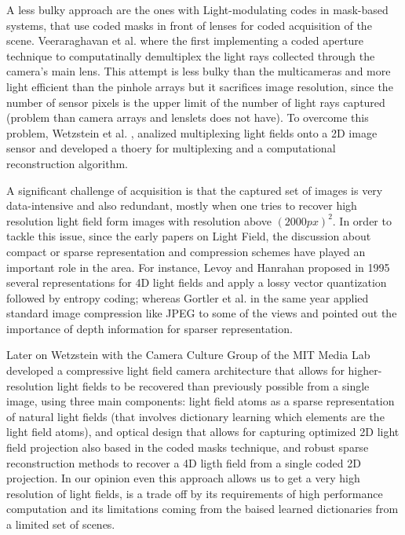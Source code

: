 \bigskip

A less bulky approach are the ones with Light-modulating codes in mask-based systems, that use coded masks in front of lenses for coded acquisition of the scene. Veeraraghavan et al. \cite{Veeraraghavan} where the first implementing a coded aperture technique to computatinally demultiplex the light rays collected through the camera's main lens. This attempt is less bulky than the multicameras and more light efficient than the pinhole arrays but it sacrifices image resolution, since the number of sensor pixels is the upper limit of the number of light rays captured (problem than camera arrays and lenslets does not have). To overcome this problem, Wetzstein et al. \cite{Wetzstein}, analized multiplexing light fields onto a 2D image sensor and developed a thoery for multiplexing and a computational reconstruction algorithm. 

\bigskip

A significant challenge of acquisition is that the captured set of images is very data-intensive and also redundant, mostly when one tries to recover high resolution light field form images with resolution above $(2000px)^2$. In order to tackle this issue, since the early papers on Light Field, the discussion about compact or sparse representation and compression schemes have played an important role in the area. For instance, Levoy and Hanrahan \cite{Levoy} proposed in 1995 several representations for 4D light fields and apply a lossy vector quantization followed by entropy coding; whereas Gortler et al. \cite{Gortler} in the same year applied standard image compression like JPEG to some of the views and pointed out the importance of depth information for sparser representation.

\bigskip

Later on Wetzstein with the Camera Culture Group of the MIT Media Lab developed a compressive light field camera architecture that allows for higher-resolution light fields to be recovered than previously possible from a single image, using three main components: light field atoms as a sparse representation of natural light fields (that involves dictionary learning which elements are the light field atoms), and optical design that allows for capturing optimized 2D light field projection also based in the coded masks technique, and robust sparse reconstruction methods to recover a 4D ligth field from a single coded 2D projection. In our opinion even this approach allows us to get a very high resolution of light fields, is a trade off by its requirements of high performance computation and its limitations coming from the baised learned dictionaries from a limited set of scenes. 

